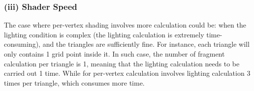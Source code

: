 \documentclass[11pt]{article}
\begin{document}
\subsubsection*{(iii) Shader Speed}
The case where per-vertex shading involves more calculation could be: when the lighting condition is complex (the lighting calculation is extremely time-consuming), and the triangles are sufficiently fine. For instance, each triangle will only contains 1 grid point inside it. In such case, the number of fragment calculation per triangle is 1, meaning that the lighting calculation needs to be carried out 1 time. While for per-vertex calculation involves lighting calculation 3 times per triangle, which consumes more time. 
\end{document}
